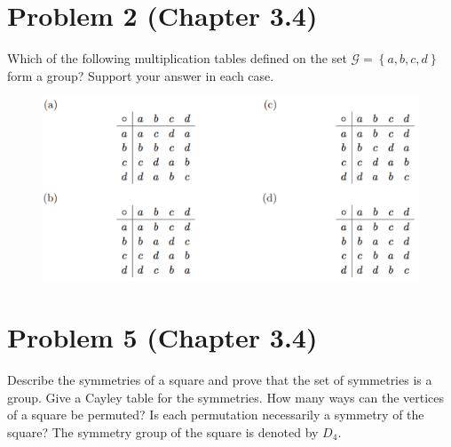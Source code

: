 \documentclass[cm, 10pt]{article}
\newcommand{\set}[1]{\ensuremath{ \left\{ #1 \right\} }}
\begin{document}

    \section*{Problem 2 (Chapter 3.4)}
      Which of the following multiplication tables defined on the set
      $\mathcal{G} = \set{a,b,c,d}$ form a group? Support your answer
      in each case.
      \begin{figure}[h!]
        \centering
        \includegraphics{fig1.png}
      \end{figure}

    \hrulefill %

    \clearpage %


    \section*{Problem 5 (Chapter 3.4)}
      Describe the symmetries of a square and prove that the set of
      symmetries is a group. Give a Cayley table for the symmetries.
      How many ways can the vertices of a square be permuted? Is each
      permutation necessarily a symmetry of the square? The symmetry
      group of the square is denoted by $D_4$.

    \hrulefill %

    \clearpage

\end{document}
